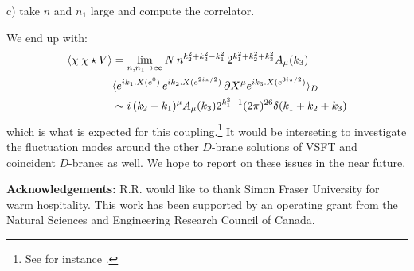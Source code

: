 \documentclass[a4paper,12pt]{article}
\begin{document}
c) take $n$ and $n_1$ large and compute the correlator.

We end up with:
\begin{align}
\langle\chi|\chi\star V\rangle&=
\lim_{n,n_1\to\infty}N\,n^{k_2^2+k_3^2-k_1^2}\, 2^{k_1^2+k_2^2+k_3^2}A_\mu(k_3)
\notag \\
& 
\langle e^{ik_1.X(e^0)}\,e^{ik_2.X(e^{2i\pi/2})}
\,\partial X^\mu e^{ik_3.X(e^{3i\pi/2})}\rangle_D
\notag \\
&
\sim i\,(k_2-k_1)^\mu A_\mu(k_3)2^{k_1^2-1} 
(2\pi)^{26}\delta(k_1+k_2+k_3)
\label{33}
\end{align}
which is what is expected for this coupling.\footnote{See for instance 
\cite{gsw}.}
It would be interseting to investigate the fluctuation modes around the other 
$D$-brane solutions of VSFT and coincident $D$-branes as well. We hope to 
report on these issues in the near future.

\vspace*{.8cm}

{\bf Acknowledgements:}  R.R. would like to thank Simon Fraser
University for warm hospitality. This work has been supported by an
operating grant from the Natural Sciences and Engineering Research Council
of Canada.

\vspace*{.8cm}
\end{document}
